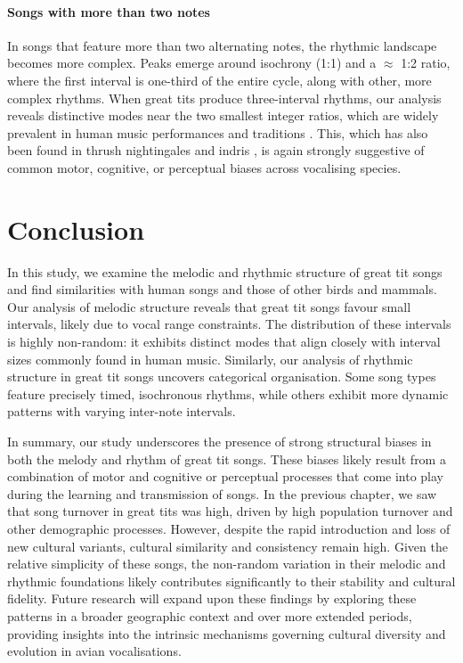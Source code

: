 \paragraph{Songs with more than two notes}
In songs that feature more than two alternating notes, the rhythmic landscape becomes more complex. Peaks emerge around isochrony (1:1) and a $\approx$ 1:2 ratio, where the first interval is one-third of the entire cycle, along with other, more complex rhythms. When great tits produce three-interval rhythms, our analysis reveals distinctive modes near the two smallest integer ratios, which are widely prevalent in human music performances and traditions \autocite{jacoby2017a, jacoby2021}. This, which has also been found in thrush nightingales and indris \autocite{roeske2020, degregorio2021}, is again strongly suggestive of common motor, cognitive, or perceptual biases across vocalising species.

\section{Conclusion} 

In this study, we examine the melodic and rhythmic structure of great tit songs and find similarities with human songs and those of other birds and mammals. Our analysis of melodic structure reveals that great tit songs favour small intervals, likely due to vocal range constraints. The distribution of these intervals is highly non-random: it exhibits distinct modes that align closely with interval sizes commonly found in human music. Similarly, our analysis of rhythmic structure in great tit songs uncovers categorical organisation. Some song types feature precisely timed, isochronous rhythms, while others exhibit more dynamic patterns with varying inter-note intervals.

In summary, our study underscores the presence of strong structural biases in both the melody and rhythm of great tit songs. These biases likely result from a combination of motor and cognitive or perceptual processes that come into play during the learning and transmission of songs. In the previous chapter, we saw that song turnover in great tits was high, driven by high population turnover and other demographic processes. However, despite the rapid introduction and loss of new cultural variants, cultural similarity and consistency remain high. Given the relative simplicity of these songs, the non-random variation in their melodic and rhythmic foundations likely contributes significantly to their stability and cultural fidelity. Future research will expand upon these findings by exploring these patterns in a broader geographic context and over more extended periods, providing insights into the intrinsic mechanisms governing cultural diversity and evolution in avian vocalisations.

